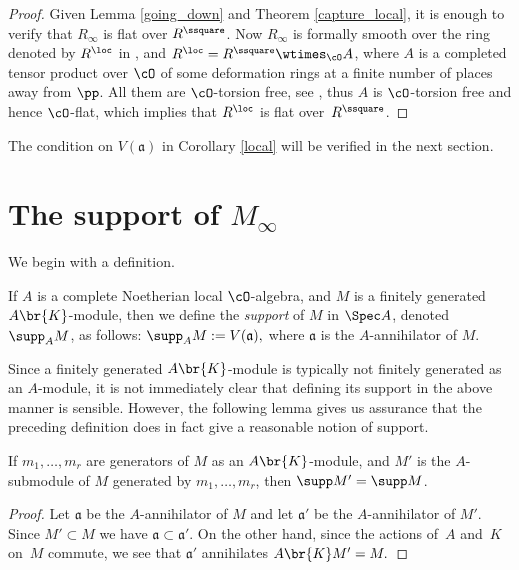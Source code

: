 \begin{proof} Given Lemma \ref{going_down} and Theorem \ref{capture_local}, it is enough to verify that $R_{\infty}$ is flat over $R^\ssquare$. Now
$R_{\infty}$ is formally smooth over the ring denoted by $R^{\loc}$ in \cite[\S 2.6]{six-authors}, and $R^{\loc}= R^\ssquare \wtimes_{\cO} A$, where
$A$ is a completed tensor product over $\cO$ of some deformation rings at a finite number of places away from $\pp$. All them are $\cO$-torsion free, see
\hbox{\cite[\S 2.4]{six-authors}}, thus $A$ is $\cO$-torsion free and hence $\cO$-flat, which implies that $R^{\loc}$ is flat over~$R^\ssquare$.
\end{proof}

The condition on $V(\mathfrak a)$ in Corollary \ref{local} will be verified in the next section.

\section{The support of \texorpdfstring{$M_{\infty}$}{Minf}}\label{support}
We begin with a definition.

\begin{defi}\label{define_support} If $A$ is a complete Noetherian
local $\cO$-algebra,
and $M$ is a finitely generated $A\br{K}$-module,
then we define the {\em support} of $M$ in $\Spec A$, denoted
$\supp_A M$, as follows:
$\supp_A M:= V(\mathfrak a),$
where $\mathfrak a$ is the $A$-annihilator of $M$.
\end{defi}

Since a finitely generated $A\br{K}$-module is typically not finitely generated
as an $A$\nobreakdash-module, it is not immediately clear that defining its support
in the above manner is sensible. However, the following lemma gives
us assurance that the preceding definition does in fact give a reasonable
notion of support.

\begin{lem}\label{all_finite} If $m_1, \ldots, m_r$ are generators of $M$
as an $A\br{K}$-module, and $M'$ is the $A$-submodule
of $M$ generated by $m_1, \ldots, m_r$,
then $\supp M'=\supp M$.
\end{lem}

\begin{proof} Let $\mathfrak a$ be the $A$-annihilator of $M$ and let $\mathfrak a'$ be the $A$-annihilator of $M'$. Since $M'\subset M$
we have $\mathfrak a\subset \mathfrak a'$.
On the other hand, since the actions of~$A$ and~$K$ on~$M$ commute,
we see that $\mathfrak a'$ annihilates $A\br{K}M' = M.$
\end{proof}

